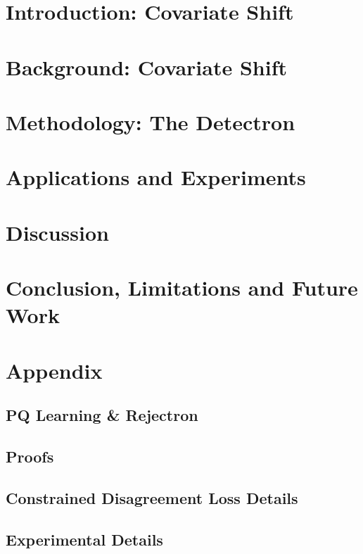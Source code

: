 \documentclass{ut-thesis}
\begin{document}
    \chapter[Introduction]{Introduction: Covariate Shift}
    \label{ch:intro}

    


    \chapter[Background: Covariate Shift]{Background: Covariate Shift}\label{ch:related}

    

    \chapter[Methodology: The Detectron]{Methodology: The Detectron}\label{ch:detectron}

    


    \chapter{Applications and Experiments}\label{ch:experiments}
    


    \chapter{Discussion}\label{ch:discussion}
    


    \chapter{Conclusion, Limitations and Future Work}\label{ch:conclusion}
    

    

    \appendix


    \chapter{Appendix}\label{ch:appendix}


    \section{PQ Learning \& Rejectron}\label{sec:rejectron}
    


    \section{Proofs}\label{sec:proofs}
    

    \section{Constrained Disagreement Loss Details}
    \label{sec:cons_dis_det}
    

    \section{Experimental Details}
    \label{sec:expdet}
    
\end{document}
